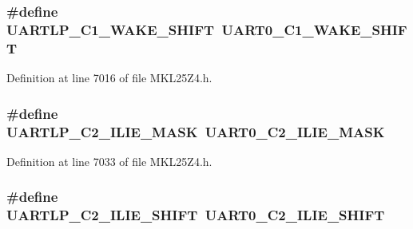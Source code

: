 \subsubsection[{\texorpdfstring{U\+A\+R\+T\+L\+P\+\_\+\+C1\+\_\+\+W\+A\+K\+E\+\_\+\+S\+H\+I\+FT}{UARTLP_C1_WAKE_SHIFT}}]{\setlength{\rightskip}{0pt plus 5cm}\#define U\+A\+R\+T\+L\+P\+\_\+\+C1\+\_\+\+W\+A\+K\+E\+\_\+\+S\+H\+I\+FT~{\bf U\+A\+R\+T0\+\_\+\+C1\+\_\+\+W\+A\+K\+E\+\_\+\+S\+H\+I\+FT}}\hypertarget{group___backward___compatibility___symbols_ga4ca5a7f2cdef379d91da768a34275930}{}\label{group___backward___compatibility___symbols_ga4ca5a7f2cdef379d91da768a34275930}


Definition at line 7016 of file M\+K\+L25\+Z4.\+h.

\subsubsection[{\texorpdfstring{U\+A\+R\+T\+L\+P\+\_\+\+C2\+\_\+\+I\+L\+I\+E\+\_\+\+M\+A\+SK}{UARTLP_C2_ILIE_MASK}}]{\setlength{\rightskip}{0pt plus 5cm}\#define U\+A\+R\+T\+L\+P\+\_\+\+C2\+\_\+\+I\+L\+I\+E\+\_\+\+M\+A\+SK~{\bf U\+A\+R\+T0\+\_\+\+C2\+\_\+\+I\+L\+I\+E\+\_\+\+M\+A\+SK}}\hypertarget{group___backward___compatibility___symbols_ga4be20f5bad98489c568fb934dcd22d87}{}\label{group___backward___compatibility___symbols_ga4be20f5bad98489c568fb934dcd22d87}


Definition at line 7033 of file M\+K\+L25\+Z4.\+h.

\subsubsection[{\texorpdfstring{U\+A\+R\+T\+L\+P\+\_\+\+C2\+\_\+\+I\+L\+I\+E\+\_\+\+S\+H\+I\+FT}{UARTLP_C2_ILIE_SHIFT}}]{\setlength{\rightskip}{0pt plus 5cm}\#define U\+A\+R\+T\+L\+P\+\_\+\+C2\+\_\+\+I\+L\+I\+E\+\_\+\+S\+H\+I\+FT~{\bf U\+A\+R\+T0\+\_\+\+C2\+\_\+\+I\+L\+I\+E\+\_\+\+S\+H\+I\+FT}}\hypertarget{group___backward___compatibility___symbols_gab90e873c1b169d382f638afbf736e569}{}\label{group___backward___compatibility___symbols_gab90e873c1b169d382f638afbf736e569}


